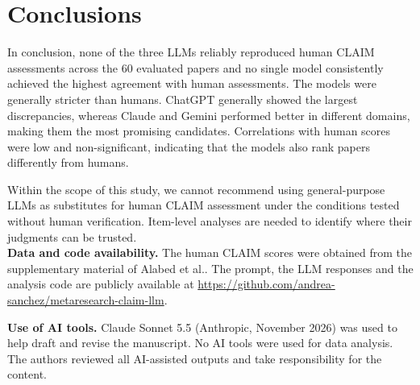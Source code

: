 \section{Conclusions}
In conclusion, none of the three LLMs reliably reproduced human CLAIM assessments across the 60 evaluated papers and no single model consistently achieved the highest agreement with human assessments. The models were generally stricter than humans. ChatGPT generally showed the largest discrepancies, whereas Claude and Gemini performed better in different domains, making them the most promising candidates. Correlations with human scores were low and non-significant, indicating that the models also rank papers differently from humans.

Within the scope of this study, we cannot recommend using general-purpose LLMs as substitutes for human CLAIM assessment under the conditions tested without human verification. Item-level analyses are needed to identify where their judgments can be trusted.\\

\noindent
\textbf{Data and code availability.} The human CLAIM scores were obtained from the supplementary material of Alabed et al.\cite{alabed2022quality}. The prompt, the LLM responses and the analysis code are publicly available at \url{https://github.com/andrea-sanchez/metaresearch-claim-llm}.

\medskip
\noindent
\textbf{Use of AI tools.} Claude Sonnet 5.5 (Anthropic, November 2026) was used to help draft and revise the manuscript. No AI tools were used for data analysis. The authors reviewed all AI-assisted outputs and take responsibility for the content.
